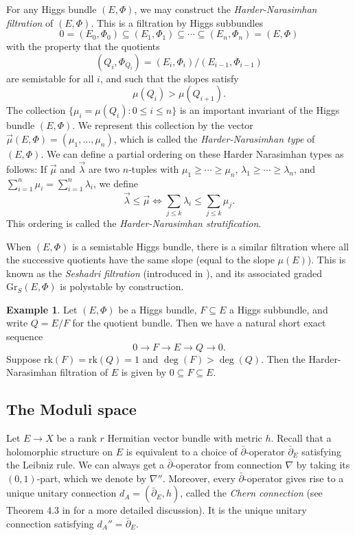 \documentclass[10pt]{amsart}
\numberwithin{equation}{section}
\newcommand{\Gr}{\mathrm{Gr}}
\newcommand{\rk}{\mathrm{rk}}
\theoremstyle{plain}
\theoremstyle{definition}
\newtheorem{ex}[thm]{Example}
\theoremstyle{remark}
\begin{document}
For any Higgs bundle $(E, \Phi)$, we may construct the \emph{Harder-Narasimhan filtration} of $(E, \Phi)$. This is a filtration by Higgs subbundles
\[0 = (E_0, \Phi_0) \subseteq (E_1, \Phi_1) \subseteq \cdots \subseteq (E_n, \Phi_n) = (E, \Phi)\]
with the property that the quotients 
\[(Q_i, \Phi_{Q_i}) = (E_i, \Phi_i)/(E_{i-1}, \Phi_{i-1})\]
are semistable for all $i$, and such that the slopes satisfy
\[\mu(Q_i) > \mu(Q_{i+1}).\]
The collection $\{\mu_i = \mu(Q_i) : 0 \le i \le n \}$ is an important invariant of the Higgs bundle $(E, \Phi)$. We represent this collection by the vector $\vec{\mu}(E, \Phi) = (\mu_1, \hdots, \mu_n)$, which is called the \emph{Harder-Narasimhan type} of $(E, \Phi)$. We can define a partial ordering on these Harder Narasimhan types as follows: If $\vec{\mu}$ and $\vec{\lambda}$ are two $n$-tuples with $\mu_1 \ge \cdots \ge \mu_n$, $\lambda_1 \ge \cdots \ge \lambda_n$, and $\sum_{i = 1}^n \mu_i = \sum_{i = 1}^n \lambda_i$, we define
\[\vec{\lambda} \le \vec{\mu} \iff \sum_{j \le k} \lambda_i \le \sum_{j \le k} \mu_j.\]
This ordering is called the \emph{Harder-Narasimhan stratification}.

When $(E, \Phi)$ is a semistable Higgs bundle, there is a similar filtration where all the successive quotients have the same slope (equal to the slope $\mu(E)$). This is known as the \emph{Seshadri filtration} (introduced in \cite{seshadri1967}), and its associated graded $\Gr_S(E, \Phi)$ is polystable by construction. 

\begin{ex}
    Let $(E, \Phi)$ be a Higgs bundle, $F \subseteq E$ a Higgs subbundle, and write $Q = E/F$ for the quotient bundle. Then we have a natural short exact sequence
    \[0 \to F \to E \to Q \to 0.\]
    Suppose $\rk(F) = \rk(Q) = 1$ and $\deg(F) > \deg(Q)$. Then the Harder-Narasimhan filtration of $E$ is given by $0 \subseteq F \subseteq E$.
\end{ex}

\subsection{The Moduli space}

Let $E \to X$ be a rank $r$ Hermitian vector bundle with metric $h$. Recall that a holomorphic structure on $E$ is equivalent to a choice of $\bar{\partial}$-operator $\bar{\partial}_E$ satisfying the Leibniz rule. We can always get a $\bar{\partial}$-operator from connection $\nabla$ by taking its $(0, 1)$-part, which we denote by $\nabla''$. Moreover, every $\bar{\partial}$-operator gives rise to a unique unitary connection $d_A = (\bar{\partial}_E, h)$, called the \emph{Chern connection} (see Theorem 4.3 in \cite{moroianu2006} for a more detailed discussion). It is the unique unitary connection satisfying $d_A'' =\bar{\partial}_E $.
\end{document}
